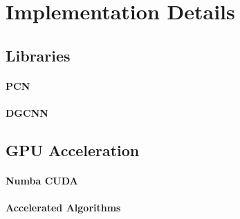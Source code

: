 \section{Implementation Details}

\subsection{Libraries}
\paragraph{PCN}
\paragraph{DGCNN}

\subsection{GPU Acceleration}
\paragraph{Numba CUDA}
\paragraph{Accelerated Algorithms}